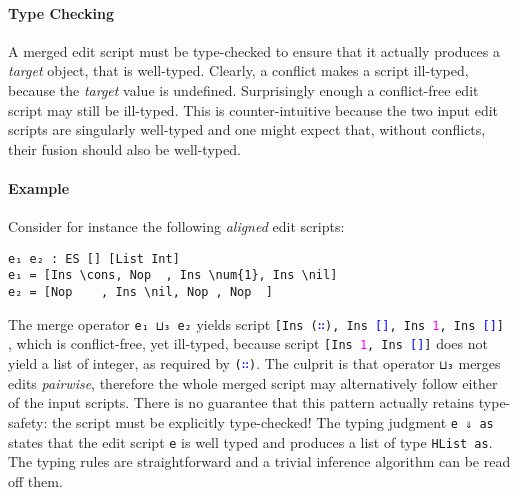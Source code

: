 \documentclass{sigplanconf}
\theoremstyle{plain}
\newcommand{\nil}{\textcolor{blue}{\texttt{[]}}}
\newcommand{\cons}{\texttt{(\textcolor{blue}{∷})}}
\newcommand{\num}[1]{\textcolor{magenta}{\texttt{#1}}}
\begin{document}
\paragraph{Type Checking}
A merged edit script must be type-checked to ensure that it actually
produces a \emph{target} object, that is well-typed.
%
Clearly, a conflict makes a script ill-typed, because the \emph{target}
value is undefined.
%
Surprisingly enough a conflict-free edit script may still be
ill-typed.
%
This is counter-intuitive because the two input edit scripts are
singularly well-typed and one might expect that, without conflicts,
their fusion should also be well-typed.
%

\paragraph{Example} Consider for instance the following \emph{aligned}
edit scripts:
\begin{Verbatim}[commandchars=\\\{\}]
e₁ e₂ : ES [] [List Int]
e₁ = [Ins \cons, Nop  , Ins \num{1}, Ins \nil]
e₂ = [Nop    , Ins \nil, Nop , Nop  ]
\end{Verbatim}
The merge operator \texttt{e₁ ⊔₃ e₂} yields script \texttt{[Ins \cons,
  Ins \nil, Ins \num{1}, Ins \nil]} , which is conflict-free, yet
ill-typed, because script \texttt{[Ins \num{1}, Ins \nil]} does not
yield a list of integer, as required by \texttt{\cons}.
%
The culprit is that operator \texttt{⊔₃} merges edits \emph{pairwise},
therefore the whole merged script may alternatively follow either of
the input scripts.
%
There is no guarantee that this pattern actually retains type-safety:
the script must be explicitly type-checked!
%
The typing judgment \texttt{e ⇓ as} states that the edit script
\texttt{e} is well typed and produces a list of type \texttt{HList
  as}.
%
The typing rules are straightforward and a trivial inference algorithm
can be read off them.
%
        
\end{document}
